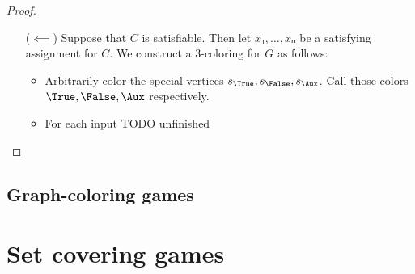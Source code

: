 \begin{proof}
\begin{itemize}
    \item[(\(⟸\))] Suppose that \(C\) is satisfiable.  Then let
      \(x₁,\dotsc,xₙ\) be a satisfying assignment for \(C\).  We construct a
      3-coloring for \(G\) as follows:
      \begin{itemize}
        \item Arbitrarily color the special vertices
          \(s_\True,s_\False,s_\Aux\).  Call those colors \(\True,\False,\Aux\)
          respectively.
        \item For each input TODO unfinished
      \end{itemize}


  \end{itemize}


\end{proof}



\subsection{Graph-coloring games}



\section{Set covering games}
